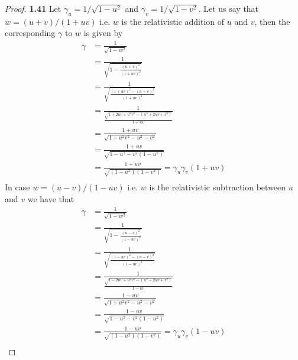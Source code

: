 \documentclass[11pt]{article}
\theoremstyle{definition}
\begin{document}
\cleardoublepage
    \begin{proof}{\textbf{1.41}}
        Let $\gamma_u = 1/\sqrt{1-u^2}$ and $\gamma_v = 1/\sqrt{1-v^2}$.
        Let us say that $w = (u + v)/(1 + uv)$ i.e. $w$ is the relativistic addition
        of $u$ and $v$, then the corresponding $\gamma$ to $w$ is given by  
        \begin{align*}
            \gamma &= \frac{1}{\sqrt{1-w^2}}\\
                &= \frac{1}{\sqrt{1-\frac{(u+v)^2}{(1+uv)^2}}}\\
                &= \frac{1}{\sqrt{\frac{(1+uv)^2 -(u+v)^2}{(1+uv)^2}}}\\
                &= \frac{1}{\frac{\sqrt{1+2uv+u^2v^2 - (u^2 + 2uv +v^2)}}{1+uv}}\\
                &= \frac{1+uv}{\sqrt{1+u^2v^2 -u^2 -v^2}}\\
                &= \frac{1+uv}{\sqrt{1-u^2 -v^2(1-u^2)}}\\
                &= \frac{1+uv}{\sqrt{(1-u^2)(1-v^2)}} = \gamma_u \gamma_v (1+uv)\\
        \end{align*}
        In case $w = (u - v)/(1 - uv)$ i.e. $w$ is the relativistic subtraction
        between $u$ and $v$ we have that
        \begin{align*}
            \gamma &= \frac{1}{\sqrt{1-w^2}}\\
                &= \frac{1}{\sqrt{1-\frac{(u-v)^2}{(1-uv)^2}}}\\
                &= \frac{1}{\sqrt{\frac{(1-uv)^2 -(u-v)^2}{(1-uv)^2}}}\\
                &= \frac{1}{\frac{\sqrt{1-2uv+u^2v^2 - (u^2 - 2uv +v^2)}}{1-uv}}\\
                &= \frac{1-uv}{\sqrt{1+u^2v^2 -u^2 -v^2}}\\
                &= \frac{1-uv}{\sqrt{1-u^2 -v^2(1-u^2)}}\\
                &= \frac{1-uv}{\sqrt{(1-u^2)(1-v^2)}} = \gamma_u \gamma_v (1-uv)\\
        \end{align*}
    \end{proof}
\cleardoublepage
\end{document}
